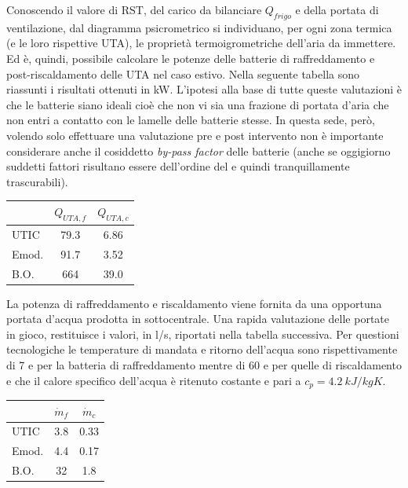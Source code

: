 Conoscendo il valore di RST, del carico da bilanciare $Q_{frigo}$ e della portata di ventilazione, dal diagramma psicrometrico si individuano, per ogni zona termica (e le loro rispettive UTA), le proprietà termoigrometriche dell'aria da immettere. Ed è, quindi, possibile calcolare le potenze delle batterie di raffreddamento e post-riscaldamento delle UTA nel caso estivo. Nella seguente tabella sono riassunti i risultati ottenuti in \si{kW}. L'ipotesi alla base di tutte queste valutazioni è che le batterie siano ideali cioè che non vi sia una frazione di portata d'aria che non entri a contatto con le lamelle delle batterie stesse. In questa sede, però, volendo solo effettuare una valutazione pre e post intervento non è importante considerare anche il cosiddetto \emph{by-pass factor} delle batterie (anche se oggigiorno suddetti fattori risultano essere dell'ordine del  e quindi tranquillamente trascurabili).
\begin{center}
	\begin{tabular}{lcc}
		&	$Q_{UTA,f}$		&	$Q_{UTA,c}$\\
		\midrule
		UTIC	&	\num{79.3}			&	\num{6.86}\\
		Emod.	&	\num{91.7}			&	\num{3.52}\\
		B.O.	&	\num{664}			&	\num{39.0}\\
	\end{tabular}
\end{center}
La potenza di raffreddamento e riscaldamento viene fornita da una opportuna portata d'acqua prodotta in sottocentrale. Una rapida valutazione delle portate in gioco, restituisce i valori, in \si{l/s}, riportati nella tabella successiva. Per questioni tecnologiche le temperature di mandata e ritorno dell'acqua sono rispettivamente di \num{7} e  per la batteria di raffreddamento mentre di \num{60} e  per quelle di riscaldamento e che il calore specifico dell'acqua è ritenuto costante e pari a $c_p=\SI{4.2}{kJ/kgK}$.
\begin{center}
	\begin{tabular}{lcc}
			&	$\dot{m}_f$	&	$\dot{m}_c$\\
			\midrule
			UTIC	&	\num{3.8}	&	\num{0.33}\\
			Emod.	&	\num{4.4}	&	\num{0.17}\\
			B.O.	&	\num{32}		&	\num{1.8}\\
	\end{tabular}
\end{center}

